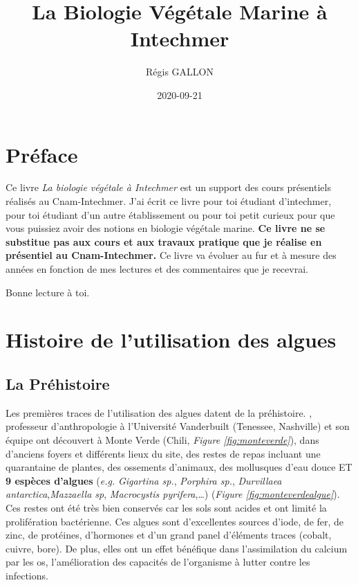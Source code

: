\documentclass[
]{book}
\title{La Biologie Végétale Marine à Intechmer}
\author{Régis GALLON}
\date{2020-09-21}
\begin{document}
\maketitle

{
\hypersetup{linkcolor=}
\setcounter{tocdepth}{1}
\tableofcontents
}
\hypertarget{pruxe9face}{%
\chapter*{Préface}\label{pruxe9face}}

Ce livre \emph{La biologie végétale à Intechmer} est un support des cours présentiels réalisés au Cnam-Intechmer. J'ai écrit ce livre pour toi étudiant d'intechmer, pour toi étudiant d'un autre établissement ou pour toi petit curieux pour que vous puissiez avoir des notions en biologie végétale marine. \textbf{Ce livre ne se substitue pas aux cours et aux travaux pratique que je réalise en présentiel au Cnam-Intechmer.} Ce livre va évoluer au fur et à mesure des années en fonction de mes lectures et des commentaires que je recevrai.

Bonne lecture à toi.

\hypertarget{histoire}{%
\chapter{Histoire de l'utilisation des algues}\label{histoire}}

\hypertarget{la-pruxe9histoire}{%
\section{La Préhistoire}\label{la-pruxe9histoire}}

Les premières traces de l'utilisation des algues datent de la préhistoire. \citet{dillehay2008}, professeur d'anthropologie à l'Université Vanderbuilt (Tenessee, Nashville) et son équipe ont découvert à Monte Verde (Chili, \emph{Figure \ref{fig:monteverde}}), dans d'anciens foyers et différents lieux du site, des restes de repas incluant une quarantaine de plantes, des ossements d'animaux, des mollusques d'eau douce ET \textbf{9 espèces d'algues} (\emph{e.g.} \emph{Gigartina sp.}, \emph{Porphira sp.}, \emph{Durvillaea antarctica},\emph{Mazzaella sp}, \emph{Macrocystis pyrifera},\ldots) (\emph{Figure \ref{fig:monteverdealgue}}). Ces restes ont été très bien conservés car les sols sont acides et ont limité la prolifération bactérienne.
Ces algues sont d'excellentes sources d'iode, de fer, de zinc, de protéines, d'hormones et d'un grand panel d'éléments traces (cobalt, cuivre, bore). De plus, elles ont un effet bénéfique dans l'assimilation du calcium par les os, l'amélioration des capacités de l'organisme à lutter contre les infections.
\end{document}
